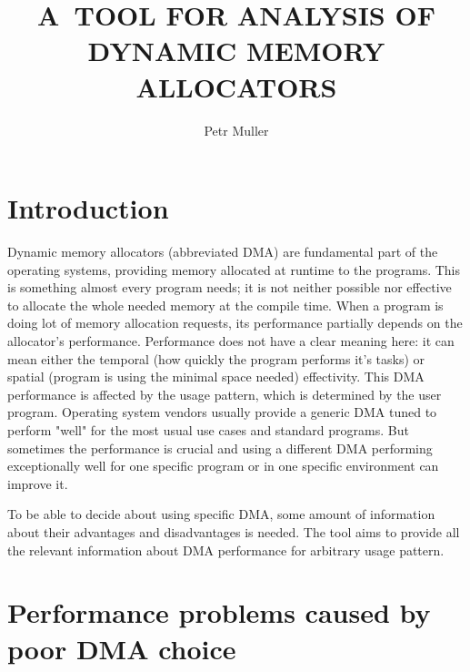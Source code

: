 \documentclass{eeict}
\title{A~TOOL FOR ANALYSIS OF DYNAMIC MEMORY ALLOCATORS}
\author{Petr Muller}
\begin{document}

\maketitle

\section{Introduction}

Dynamic memory allocators (abbreviated DMA) are fundamental part of the operating systems, providing memory allocated at runtime to the programs. This is something almost every program needs; it is not neither possible nor effective to allocate the whole needed memory at the compile time. When a program is doing lot of memory allocation requests, its performance partially depends on the allocator's performance. Performance does not have a clear meaning here: it can mean either the temporal (how quickly the program performs it's tasks) or spatial (program is using the minimal space needed) effectivity. This DMA performance is affected by the usage pattern, which is determined by the user program. Operating system vendors usually provide a generic DMA tuned to perform "well" for the most usual use cases and standard programs. But sometimes the performance is crucial and using a different DMA performing exceptionally well for one specific program or in one specific environment can improve it.

To be able to decide about using specific DMA, some amount of information about their advantages and disadvantages is needed. The tool aims to provide all the relevant information about DMA performance for arbitrary usage pattern.

\section{Performance problems caused by poor DMA choice}
\end{document}
